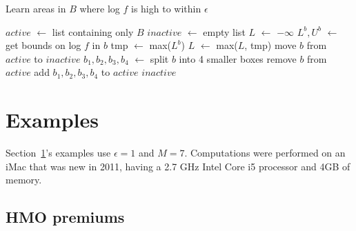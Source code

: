 \documentclass{report}
\newcommand*\Let[2]{\State #1 $\gets$ #2}
\begin{document}
\begin{algorithm}[H]
  \caption{Learn areas in $B$ where log $f$ is high to within $\epsilon$
    \label{alg:findf}}
  \begin{algorithmic}[1]
      \Let{$active$}{list containing only $B$}
      \Let{$inactive$}{empty list}
      \Let{$L$}{$-\infty$}
          \Let{$L^b, U^b$}{get bounds on log $f$ in $b$ }
        \EndFor
          \Let{tmp}{max($L^b$)}
         \Let{$L$}{max($L$, tmp)}
            \State move $b$ from $active$ to $inactive$
          \Else
            \Let{$b_1, b_2, b_3, b_4$}{split $b$ into 4 smaller boxes}
            \State remove $b$ from $active$
            \State add $b_1, b_2, b_3, b_4$ to $active$
          \EndIf
        \EndFor
      \EndWhile
      \State \Return $inactive$ 
    \EndFunction
  \end{algorithmic}
\end{algorithm}


\section{Examples}
\label{sec:examp}
Section~\ref{sec:examp}'s examples use $\epsilon = 1$ and $M = 7$.
Computations were performed on an iMac that was new in 2011, having a 2.7 GHz Intel Core i5 processor and 4GB of memory.
\subsection{HMO premiums}
\end{document}
